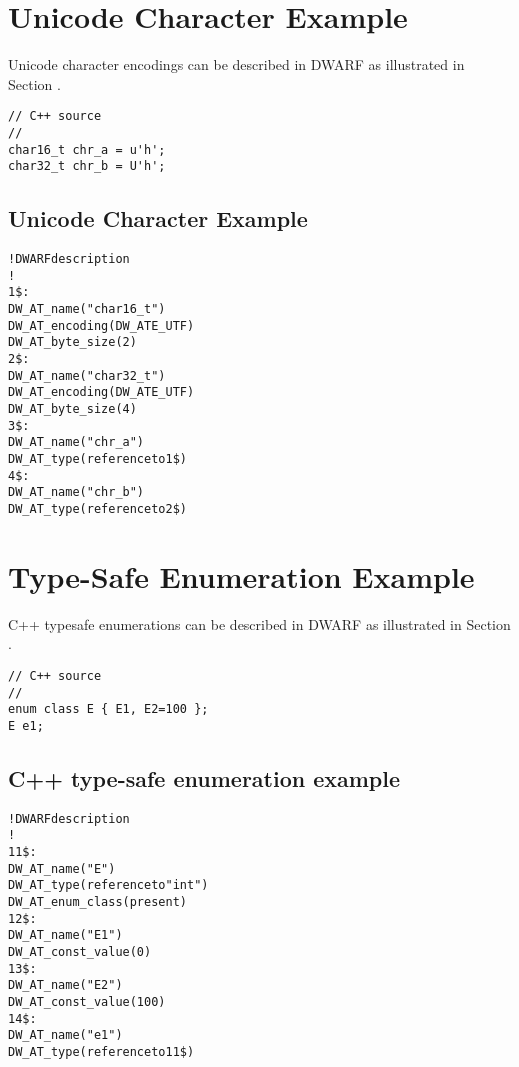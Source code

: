 \section{Unicode Character Example}
\label{app:unicodecharacterexample}

Unicode character encodings can be described in DWARF as
illustrated in 
Section .

\begin{lstlisting}
// C++ source
//
char16_t chr_a = u'h';
char32_t chr_b = U'h';
\end{lstlisting}

\subsection{Unicode Character Example}
\label{app:unicodecharacterexamplesub}
\begin{alltt}

! DWARF description
!
1\$: 
        DW\_AT\_name("char16\_t")
        DW\_AT\_encoding(DW\_ATE\_UTF)
        DW\_AT\_byte\_size(2)
2\$: 
        DW\_AT\_name("char32\_t")
        DW\_AT\_encoding(DW\_ATE\_UTF)
        DW\_AT\_byte\_size(4)
3\$: 
        DW\_AT\_name("chr\_a")
        DW\_AT\_type(reference to 1\$)
4\$: 
        DW\_AT\_name("chr\_b")
        DW\_AT\_type(reference to 2\$)
\end{alltt}



\section{Type-Safe Enumeration Example}
\label{app:typesafeenumerationexample}


C++ type\dash safe enumerations can be described in DWARF as illustrated in 
Section .

\begin{lstlisting}
// C++ source
//
enum class E { E1, E2=100 };
E e1;
\end{lstlisting}

\subsection{C++ type-safe enumeration example}
\label{app:ctypesafeenumerationexample}
\begin{alltt}
! DWARF description
!
11\$: 
        DW\_AT\_name("E")
        DW\_AT\_type(reference to "int")
        DW\_AT\_enum\_class(present)
12\$:   
            DW\_AT\_name("E1")
            DW\_AT\_const\_value(0)
13\$:
            DW\_AT\_name("E2")
            DW\_AT\_const\_value(100)
14\$: 
        DW\_AT\_name("e1")
        DW\_AT\_type(reference to 11\$)
\end{alltt}

